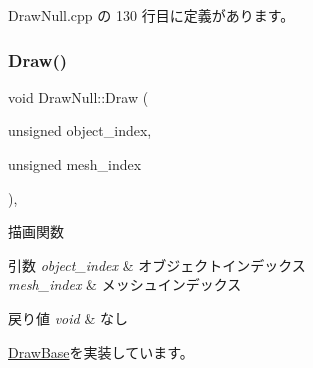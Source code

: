  Draw\+Null.\+cpp の 130 行目に定義があります。

\mbox{\label{class_draw_null_a72ac0b7dc40b1469582419dcc5b0e114}} 
\subsubsection{\texorpdfstring{Draw()}{Draw()}}
{\footnotesize\ttfamily void Draw\+Null\+::\+Draw (\begin{DoxyParamCaption}\item[{unsigned}]{object\+\_\+index,  }\item[{unsigned}]{mesh\+\_\+index }\end{DoxyParamCaption})\hspace{0.3cm}{\ttfamily [override]}, {\ttfamily [virtual]}}



描画関数 


\begin{DoxyParams}{引数}
{\em object\+\_\+index} & オブジェクトインデックス \\
\hline
{\em mesh\+\_\+index} & メッシュインデックス \\
\hline
\end{DoxyParams}

\begin{DoxyRetVals}{戻り値}
{\em void} & なし \\
\hline
\end{DoxyRetVals}


\mbox{\hyperlink{class_draw_base_a408080106630a1146d7af0bb46a4d8d1}{Draw\+Base}}を実装しています。



